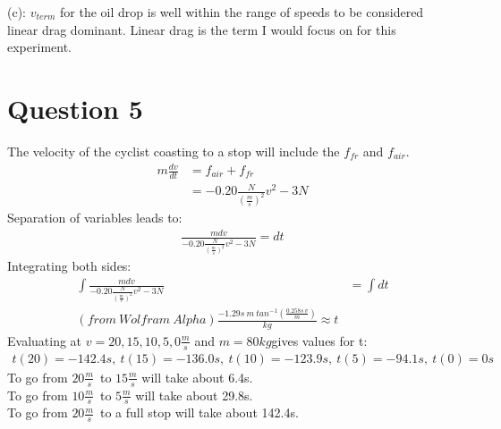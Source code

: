 \documentclass[a4paper,12pt]{article}
\begin{document}
(c):  $v_{term}$ for the oil drop is well within the range of speeds
to be considered linear drag dominant.  Linear drag is the term I
would focus on for this experiment.

\section*{Question 5}
The velocity of the cyclist coasting to a stop will include the
$f_{fr}$ and $f_{air}$.
\begin{align*}
m\frac{dv}{dt}&=f_{air}+f_{fr}\\
&=-0.20\frac{N}{(\frac{m}{s})^2}v^2-3N
\end{align*}
Separation of variables leads to:
\begin{align*}
\frac{mdv}{-0.20\frac{N}{(\frac{m}{s})^2}v^2-3N}=dt
\end{align*}
Integrating both sides:
\begin{align*}
\int\frac{mdv}{-0.20\frac{N}{(\frac{m}{s})^2}v^2-3N}&=\int dt\\
(from\  Wolfram\ Alpha)\frac{-1.29s\ m\  tan^{-1}(\frac{0.258s\ v}{m})}{kg}\approx
  t
\end{align*}
Evaluating at $v=20,15,10,5,0\frac{m}{s}$ and $m=80kg$gives values for t:
\begin{align*}
t(20)=-142.4s,\  t(15)=-136.0s,\  t(10)=-123.9s,\  t(5)=-94.1s,\  t(0)=0s
\end{align*}
To go from $20\frac{m}{s}$\ to $15\frac{m}{s}$ will take about 6.4s.\\
To go from $10\frac{m}{s}$\ to $5\frac{m}{s}$ will take about 29.8s.\\
To go from $20\frac{m}{s}$\ to a full stop will take about 142.4s.
\end{document}
